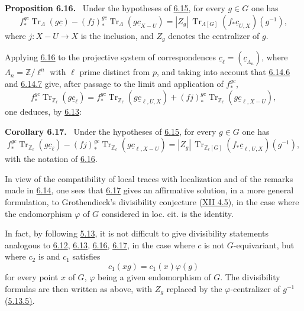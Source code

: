 \documentclass[11pt]{article}
\newenvironment{statement}[1]{\par\medskip\noindent\textbf{#1.}\ }{\par\medskip}
\providecommand{\Tr}{\operatorname{Tr}}
\providecommand{\Tr}{\operatorname{Tr}}
\providecommand{\Tr}{\operatorname{Tr}}
\providecommand{\Tr}{\operatorname{Tr}}
\providecommand{\Tr}{\operatorname{Tr}}
\begin{document}
\label{sga5:IIIB:proposition:6.16}\begin{statement}{Proposition 6.16}
Under the hypotheses of \hyperref[sga5:IIIB:subsection:6.15]{6.15}, for every $g\in G$ one has
\begin{equation}
f_*^{gc}\Tr_{\Lambda}(g\underline c)
-(fj)_*^{gc}\Tr_{\Lambda}(g\underline c_{X-U})
=
|Z_g|\,\Tr_{\Lambda[G]}(f_*\underline c_{U,X})(g^{-1}),
\tag{6.16.1}\label{sga5:IIIB:equation:6.16.1}
\end{equation}
where $j:X-U\to X$ is the inclusion, and $Z_g$ denotes the centralizer of $g$.
\end{statement}

Applying \hyperref[sga5:IIIB:proposition:6.16]{6.16} to the projective system of correspondences $\underline c_{\ell}=(\underline c_{\Lambda_n})$, where $\Lambda_n=\mathbb Z/\ell^n$ with $\ell$ prime distinct from $p$, and taking into account that \hyperref[sga5:IIIB:equation:6.14.6]{6.14.6} and \hyperref[sga5:IIIB:equation:6.14.7]{6.14.7} give, after passage to the limit and application of $f_*^{gc}$,
\[
f_*^{gc}\Tr_{\mathbb Z_{\ell}}(g\underline c_{\ell})
=
f_*^{gc}\Tr_{\mathbb Z_{\ell}}(g\underline c_{\ell,U,X})
+(fj)_*^{gc}\Tr_{\mathbb Z_{\ell}}(g\underline c_{\ell,X-U}),
\]
one deduces, by \hyperref[sga5:IIIB:subsection:6.13]{6.13}:

\label{sga5:IIIB:corollary:6.17}\begin{statement}{Corollary 6.17}
Under the hypotheses of \hyperref[sga5:IIIB:subsection:6.15]{6.15}, for every $g\in G$ one has
\begin{equation}
f_*^{gc}\Tr_{\mathbb Z_{\ell}}(g\underline c_{\ell})
-(fj)_*^{gc}\Tr_{\mathbb Z_{\ell}}(g\underline c_{\ell,X-U})
=
|Z_g|\,\Tr_{\mathbb Z_{\ell}[G]}(f_*\underline c_{\ell,U,X})(g^{-1}),
\tag{6.17.1}\label{sga5:IIIB:equation:6.17.1}
\end{equation}
with the notation of \hyperref[sga5:IIIB:proposition:6.16]{6.16}.
\end{statement}

In view of the compatibility of local traces with localization and of the remarks made in \hyperref[sga5:IIIB:subsection:6.14]{6.14}, one sees that \hyperref[sga5:IIIB:corollary:6.17]{6.17} gives an affirmative solution, in a more general formulation, to Grothendieck's divisibility conjecture (\hyperref[sga5:XII:conjecture:4.5]{XII 4.5}), in the case where the endomorphism $\varphi$ of $G$ considered in loc. cit. is the identity.

In fact, by following \hyperref[sga5:IIIB:subsubsection:5.13]{5.13}, it is not difficult to give divisibility statements analogous to \hyperref[sga5:IIIB:proposition:6.12]{6.12}, \hyperref[sga5:IIIB:subsection:6.13]{6.13}, \hyperref[sga5:IIIB:proposition:6.16]{6.16}, \hyperref[sga5:IIIB:corollary:6.17]{6.17}, in the case where $c$ is not $G$-equivariant, but where $c_2$ is and $c_1$ satisfies
\[
c_1(xg)=c_1(x)\varphi(g)
\]
for every point $x$ of $G$, $\varphi$ being a given endomorphism of $G$. The divisibility formulas are then written as above, with $Z_g$ replaced by the $\varphi$-centralizer of $g^{-1}$ \hyperref[sga5:IIIB:equation:5.13.5]{(5.13.5)}.
\end{document}

